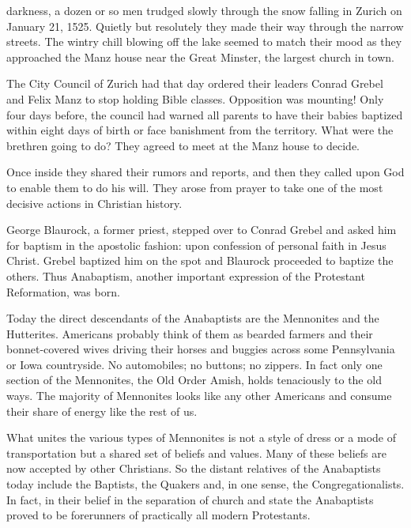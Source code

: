 
 darkness, a dozen or so men trudged slowly through the snow falling in
Zurich on January 21, 1525. Quietly but resolutely they made their way through the narrow streets.
The wintry chill blowing off the lake seemed to match their mood as they approached the Manz house
near the Great Minster, the largest church in town.

The City Council of Zurich had that day ordered their leaders Conrad Grebel and Felix Manz to stop
holding Bible classes. Opposition was mounting! Only four days before, the council had warned all
parents to have their babies baptized within eight days of birth or face banishment from the
territory. What were the brethren going to do? They agreed to meet at the Manz house to decide.

Once inside they shared their rumors and reports, and then they called upon God to enable them to do
his will. They arose from prayer to take one of the most decisive actions in Christian history.

George Blaurock, a former priest, stepped over to Conrad Grebel and asked him for baptism in the
apostolic fashion: upon confession of personal faith in Jesus Christ. Grebel baptized him on the
spot and Blaurock proceeded to baptize the others. Thus Anabaptism, another important expression of
the Protestant Reformation, was born.

Today the direct descendants of the Anabaptists are the Mennonites and the Hutterites. Americans
probably think of them as bearded farmers and their bonnet-covered wives driving their horses and
buggies across some Pennsylvania or Iowa countryside. No automobiles; no buttons; no zippers. In
fact only one section of the Mennonites, the Old Order Amish, holds tenaciously to the old ways. The
majority of Mennonites looks like any other Americans and consume their share of energy like the
rest of us.

What unites the various types of Mennonites is not a style of dress or a mode of transportation but
a shared set of beliefs and values. Many of these beliefs are now accepted by other Christians. So
the distant relatives of the Anabaptists today include the Baptists, the Quakers and, in one sense,
the Congregationalists. In fact, in their belief in the separation of church and state the
Anabaptists proved to be forerunners of practically all modern Protestants.

